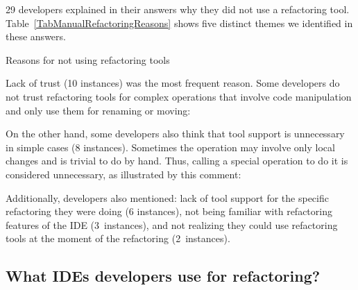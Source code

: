 29 developers explained in their answers why they did not use a refactoring tool. 
Table~\ref{TabManualRefactoringReasons} shows five distinct themes we identified in these answers.

\begin{table}[htbp]
\centering
\renewcommand{\arraystretch}{1.2}
\caption{Reasons for not using refactoring tools}
\label{TabManualRefactoringReasons}
\footnotesize

\end{table}

Lack of trust (10 instances) was the most frequent reason. Some developers do not trust
refactoring tools for complex operations that involve code manipulation and only use them for renaming
or moving:\margin

\margin

\margin

On the other hand, some developers also think that tool support is unnecessary in simple cases (8 instances).
Sometimes the operation may involve only local changes and is trivial to do by hand. Thus, calling a 
special operation to do it is considered unnecessary, as illustrated by this comment:\margin

\margin

Additionally, developers also mentioned: lack of tool support for the specific refactoring they were 
doing (6 instances), not being familiar with refactoring features of the IDE (3~instances), and not
realizing they could use refactoring tools at the moment of the refactoring (2~instances).



\subsection{What IDEs developers use for refactoring?}
\label{SecIde}


